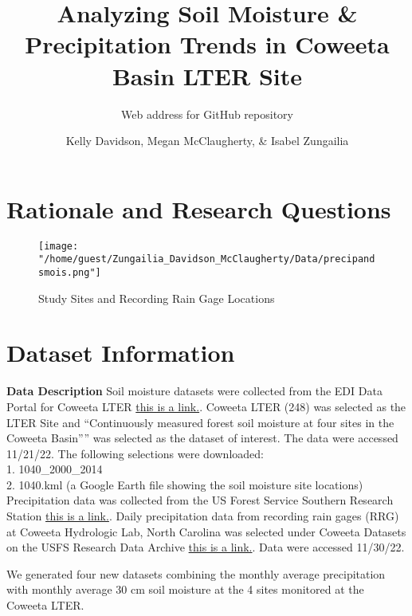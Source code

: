 \documentclass[
  12pt,
]{article}
\title{Analyzing Soil Moisture \& Precipitation Trends in Coweeta Basin
LTER Site}
\subtitle{Web address for GitHub repository}
\author{Kelly Davidson, Megan McClaugherty, \& Isabel Zungailia}
\date{}
\begin{document}
\maketitle

\newpage
\tableofcontents 
\newpage
\listoftables 
\newpage
\listoffigures 
\newpage

\hypertarget{rationale-and-research-questions}{%
\section{Rationale and Research
Questions}\label{rationale-and-research-questions}}

\begin{figure}
\centering
\texttt{[image: "/home/guest/Zungailia\_Davidson\_McClaugherty/Data/precipandsmois.png"]}
\caption{Study Sites and Recording Rain Gage Locations}
\end{figure}

\newpage

\hypertarget{dataset-information}{%
\section{Dataset Information}\label{dataset-information}}

\textbf{Data Description} Soil moisture datasets were collected from the
EDI Data Portal for Coweeta LTER
\href{https://portal.edirepository.org/nis/home.jsp}{this is a link.}.
Coweeta LTER (248) was selected as the LTER Site and ``Continuously
measured forest soil moisture at four sites in the Coweeta Basin'''' was
selected as the dataset of interest. The data were accessed 11/21/22.
The following selections were downloaded:\\
1. 1040\_2000\_2014\\
2. 1040.kml (a Google Earth file showing the soil moisture site
locations)\\
Precipitation data was collected from the US Forest Service Southern
Research Station
\href{https://www.srs.fs.usda.gov/coweeta/tools-and-data/}{this is a
link.}. Daily precipitation data from recording rain gages (RRG) at
Coweeta Hydrologic Lab, North Carolina was selected under Coweeta
Datasets on the USFS Research Data Archive
\href{https://www.fs.usda.gov/rds/archive/Catalog/RDS-2017-0031}{this is
a link.}. Data were accessed 11/30/22.

We generated four new datasets combining the monthly average
precipitation with monthly average 30 cm soil moisture at the 4 sites
monitored at the Coweeta LTER.
\end{document}
